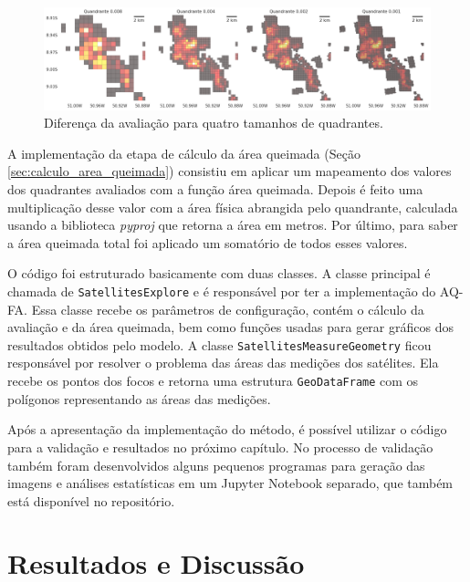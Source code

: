 \documentclass[cic,tc]{iiufrgs}
\begin{document}
\begin{figure}[!htb]
    \caption{Diferença da avaliação para quatro tamanhos de quadrantes.}
    \begin{center}
        \includegraphics[width=35em]{diferenca_entre_quadrantes}
    \end{center}
    \label{fig:diferenca_entre_quadrantes}
\end{figure}

A implementação da etapa de cálculo da área queimada (Seção \ref{sec:calculo_area_queimada}) consistiu em aplicar um mapeamento dos valores dos quadrantes avaliados com a função área queimada. Depois é feito uma multiplicação desse valor com a área física abrangida pelo quandrante, calculada usando a biblioteca \textit{pyproj} que retorna a área em metros. Por último, para saber a área queimada total foi aplicado um somatório de todos esses valores.

O código foi estruturado basicamente com duas classes. A classe principal é chamada de \texttt{SatellitesExplore} e é responsável por ter a implementação do AQ-FA. Essa classe recebe os parâmetros de configuração, contém o cálculo da avaliação e da área queimada, bem como funções usadas para gerar gráficos dos resultados obtidos pelo modelo. A classe \texttt{SatellitesMeasureGeometry} ficou responsável por resolver o problema das áreas das medições dos satélites. Ela recebe os pontos dos focos e retorna uma estrutura \texttt{GeoDataFrame} com os polígonos representando as áreas das medições.

\bigskip

Após a apresentação da implementação do método, é possível utilizar o código para a validação e resultados no próximo capítulo. No processo de validação também foram desenvolvidos alguns pequenos programas para geração das imagens e análises estatísticas em um Jupyter Notebook separado, que também está disponível no repositório. 



\chapter{Resultados e Discussão}
\label{chp:resultados_discussão}
\end{document}
